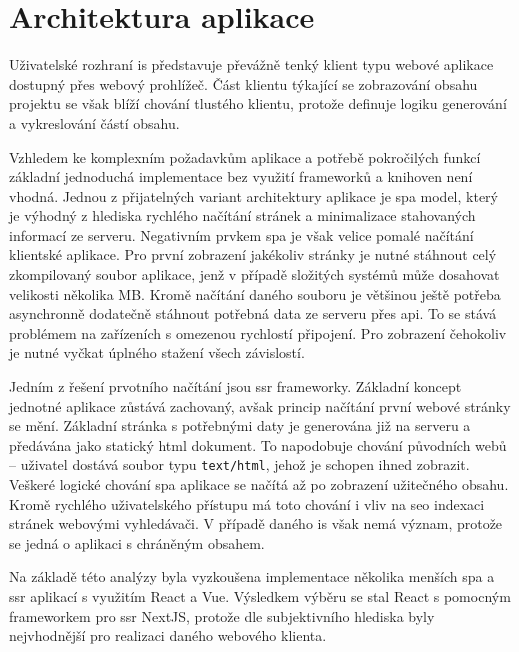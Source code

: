 

\section{Architektura aplikace}

Uživatelské rozhraní \gls{is} představuje převážně tenký klient typu webové aplikace dostupný přes webový prohlížeč. Část klientu týkající se zobrazování obsahu projektu se však blíží chování tlustého klientu, protože definuje logiku generování a vykreslování částí obsahu.

Vzhledem ke komplexním požadavkům aplikace a potřebě pokročilých funkcí základní jednoduchá implementace bez využití frameworků a knihoven není vhodná. Jednou z přijatelných variant architektury aplikace je \gls{spa} model, který je výhodný z hlediska rychlého načítání stránek a minimalizace stahovaných informací ze serveru. Negativním prvkem \gls{spa} je však velice pomalé načítání klientské aplikace. Pro první zobrazení jakékoliv stránky je nutné stáhnout celý zkompilovaný soubor aplikace, jenž v případě složitých systémů může dosahovat velikosti několika MB. Kromě načítání daného souboru je většinou ještě potřeba asynchronně dodatečně stáhnout potřebná data ze serveru přes \gls{api}. To se stává problémem na zařízeních s omezenou rychlostí připojení. Pro zobrazení čehokoliv je nutné vyčkat úplného stažení všech závislostí.

Jedním z řešení prvotního načítání jsou \gls{ssr} frameworky. Základní koncept jednotné aplikace zůstává zachovaný, avšak princip načítání první webové stránky se mění. Základní stránka s potřebnými daty je generována již na serveru a předávána jako statický \gls{html} dokument. To napodobuje chování původních webů -- uživatel dostává soubor typu \texttt{text/html}, jehož je schopen ihned zobrazit. Veškeré logické chování \gls{spa} aplikace se načítá až po zobrazení užitečného obsahu. Kromě rychlého uživatelského přístupu má toto chování i vliv na \gls{seo} indexaci stránek webovými vyhledávači. V případě daného \gls{is} však nemá význam, protože se jedná o aplikaci s chráněným obsahem.

Na základě této analýzy byla vyzkoušena implementace několika menších \gls{spa} a \gls{ssr} aplikací s využitím React a Vue. Výsledkem výběru se stal React s pomocným frameworkem pro \gls{ssr} NextJS, protože dle subjektivního hlediska byly nejvhodnější pro realizaci daného webového klienta.

